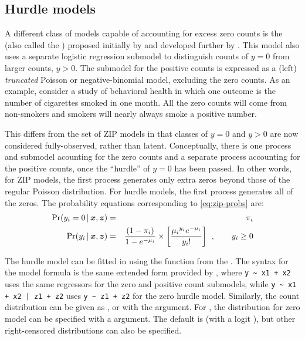 \documentclass[11pt]{book}\usepackage[]{graphicx}\usepackage[]{color}
\begin{document}
\subsection{Hurdle models}\label{sec:glm-hurdle}
A different class of models capable of accounting for excess zero counts is the 
 (also called the )
proposed initially by \citet{Cragg:1971} and developed further by
\citet{Mullahy:1986}.
This model also uses a separate logistic regression submodel to distinguish
counts of $y=0$ from larger counts, $y>0$.
The submodel for the positive counts is expressed as a (left) \emph{truncated}
Poisson or negative-binomial model, excluding the zero counts.
As an example, consider a study of behavioral health in which one outcome is
the number of cigarettes smoked in one month.  All the zero counts will come from
non-smokers and smokers will nearly always smoke a positive number.

This differs from the set of ZIP models in that classes of $y=0$ and $y>0$
are now considered fully-observed, rather than latent.
Conceptually, there is one process and submodel acounting for the zero counts
and a separate process accounting for the positive counts, once the ``hurdle''
of $y=0$ has been passed.
In other words, for ZIP models, the first process generates 
only extra zeros beyond those of the regular Poisson distribution. 
For hurdle models, the first process generates all of the zeros.
The probability equations corresponding to \eqref{eq:zip-probs} are:
\begin{eqnarray}
\Pr ({y_i} = 0 \, | \, \bm{x}, \bm{z}) &=& {\pi _i} \\
\Pr ({y_i} \, | \, \bm{x}, \bm{z}) &=& \frac{(1 - {\pi _i})}{1-e^{-\mu_i}} 
\times \left[\frac{{{\mu _i}^{{y_i}}{e^{ - {\mu _i}}}}}{{{y_i}!}} \right] \:\: , \quad\quad y_i \ge 0 \nonumber
\end{eqnarray}

The hurdle model can be fitted in \R using the  function from the .
The syntax for the model formula is the same extended form provided by ,
where \verb|y ~ x1 + x2| uses the same regressors for the zero and positive count submodels,
while \verb#y ~ x1 + x2 | z1 + z2# uses \verb|y ~ z1 + z2| for the zero hurdle model.
Similarly, the count distribution can be given 
as 
,  or 
with the  argument.  For , the distribution for zero model
can be specified with a  argument. The default is 
(with a logit ), but other right-censored
distributions can also be specified.
\end{document}
